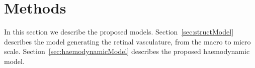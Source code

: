 \documentclass[11pt,]{article}
\begin{document}
\section{Methods}\label{sec:methods}

In this section we describe the proposed models.
Section~\ref{sec:structModel} describes the model generating the
retinal vasculature, from the macro to micro scale.
Section~\ref{sec:haemodynamicModel} describes the proposed haemodynamic
model.

\begin{figure}[ht!] \centering
    \centering
  \begin{subfigure}[t]{.02\textwidth}
  \end{subfigure}
  \begin{subfigure}[t]{.6\textwidth}
  \end{subfigure}
  \\
  \begin{subfigure}[t]{.02\textwidth}
  \end{subfigure}
  \begin{subfigure}[t]{.58\textwidth}
  \end{subfigure}


\end{figure}
\end{document}
